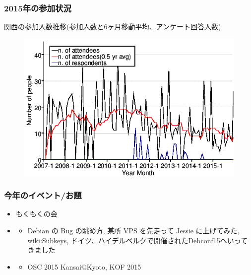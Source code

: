 \documentclass[cjk,dvipdfmx,10pt,compress,%
hyperref={bookmarks=true,bookmarksnumbered=true,bookmarksopen=false,%
colorlinks=false,%
pdftitle={第 105 回 関西 Debian 勉強会},%
pdfauthor={倉敷・のがた・佐々木・かわだ},%
pdfsubject={資料},%
}]{beamer}
\begin{document}
\begin{frame}
  \frametitle{2015年の参加状況}
  \centering
  関西の参加人数推移(参加人数と6ヶ月移動平均、アンケート回答人数)
  \begin{figure}[h]
    \begin{center}
      \includegraphics[width=.6\hsize]{image201512/memberanalysis/kansai.png}
    \end{center}
  \end{figure}
\end{frame}

\begin{frame}
  \frametitle{今年のイベント/お題}
  \begin{itemize}
  \item もくもくの会
  \item \color[rgb]{1,0,0}{セッション}
    \begin{itemize}
    \item Debian の Bug の眺め方, 某所 VPS を先走って Jessie に上げてみた,
      wiki:Subkeys, ドイツ、ハイデルベルクで開催されたDebconf15へいってきました
    \end{itemize}
  \item \color[rgb]{0,0,1}{イベント}
    \begin{itemize}
    \item OSC 2015 Kansai@Kyoto, KOF 2015
    \end{itemize}
  \end{itemize}
\end{frame}
\end{document}
